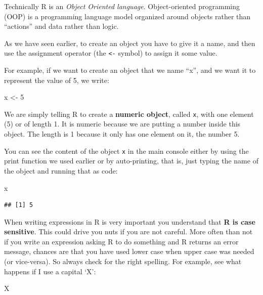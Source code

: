 \documentclass[]{book}
\newenvironment{Shaded}{\begin{snugshade}}{\end{snugshade}}
\newcommand{\DecValTok}[1]{\textcolor[rgb]{0.00,0.00,0.81}{#1}}
\newcommand{\NormalTok}[1]{#1}
\newcommand{\StringTok}[1]{\textcolor[rgb]{0.31,0.60,0.02}{#1}}
\begin{document}
Technically R is an \emph{Object Oriented language}. Object-oriented programming (OOP) is a programming language model organized around objects rather than ``actions'' and data rather than logic.

As we have seen earlier, to create an object you have to give it a name, and then use the assignment operator (the \texttt{\textless{}-} symbol) to assign it some value.

For example, if we want to create an object that we name ``x'', and we want it to represent the value of 5, we write:

\begin{Shaded}
\begin{Highlighting}[]
\NormalTok{x <-}\StringTok{ }\DecValTok{5}
\end{Highlighting}
\end{Shaded}

We are simply telling R to create a \textbf{numeric object}, called \texttt{x}, with one element (5) or of length 1. It is numeric because we are putting a number inside this object. The length is 1 because it only has one element on it, the number 5.

You can see the content of the object \texttt{x} in the main console either by using the print function we used earlier or by auto-printing, that is, just typing the name of the object and running that as code:

\begin{Shaded}
\begin{Highlighting}[]
\NormalTok{x}
\end{Highlighting}
\end{Shaded}

\begin{verbatim}
## [1] 5
\end{verbatim}

When writing expressions in R is very important you understand that \textbf{R is case sensitive}. This could drive you nuts if you are not careful. More often than not if you write an expression asking R to do something and R returns an error message, chances are that you have used lower case when upper case was needed (or vice-versa). So always check for the right spelling. For example, see what happens if I use a capital `X':

\begin{Shaded}
\begin{Highlighting}[]
\NormalTok{X}
\end{Highlighting}
\end{Shaded}
\end{document}
